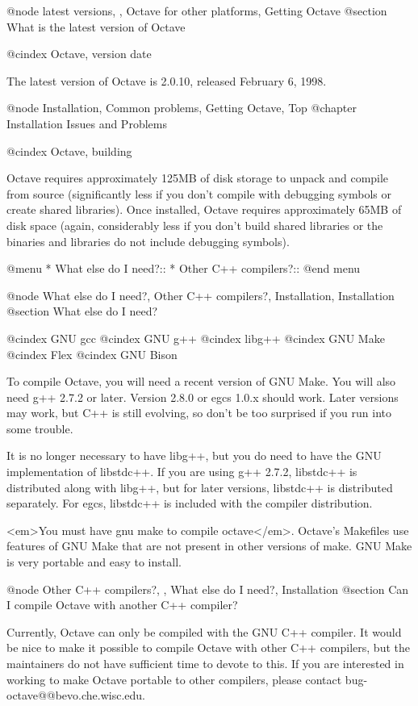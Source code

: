 @node latest versions,  , Octave for other platforms, Getting Octave
@section What is the latest version of Octave

@cindex Octave, version date

The latest version of Octave is 2.0.10, released February 6, 1998.

@node Installation, Common problems, Getting Octave, Top
@chapter Installation Issues and Problems

@cindex Octave, building 

Octave requires approximately 125MB of disk storage to unpack and
compile from source (significantly less if you don't compile with
debugging symbols or create shared libraries).  Once installed, Octave
requires approximately 65MB of disk space (again, considerably less if
you don't build shared libraries or the binaries and libraries do not
include debugging symbols).

@menu
* What else do I need?::        
* Other C++ compilers?::        
@end menu

@node What else do I need?, Other C++ compilers?, Installation, Installation
@section What else do I need?

@cindex GNU gcc
@cindex GNU g++
@cindex libg++
@cindex GNU Make
@cindex Flex
@cindex GNU Bison

To compile Octave, you will need a recent version of GNU Make.  You
will also need g++ 2.7.2 or later.  Version 2.8.0 or egcs 1.0.x should
work.  Later versions may work, but C++ is still evolving, so don't be
too surprised if you run into some trouble.

It is no longer necessary to have libg++, but you do need to have the
GNU implementation of libstdc++.  If you are using g++ 2.7.2,
libstdc++ is distributed along with libg++, but for later versions,
libstdc++ is distributed separately.  For egcs, libstdc++ is included
with the compiler distribution.

<em>You must have gnu make to compile octave</em>.  Octave's Makefiles
use features of GNU Make that are not present in other versions of make.
GNU Make is very portable and easy to install.

@node Other C++ compilers?,  , What else do I need?, Installation
@section Can I compile Octave with another C++ compiler?

Currently, Octave can only be compiled with the GNU C++ compiler.  It
would be nice to make it possible to compile Octave with other C++
compilers, but the maintainers do not have sufficient time to devote to
this.  If you are interested in working to make Octave portable to other
compilers, please contact bug-octave@@bevo.che.wisc.edu.

